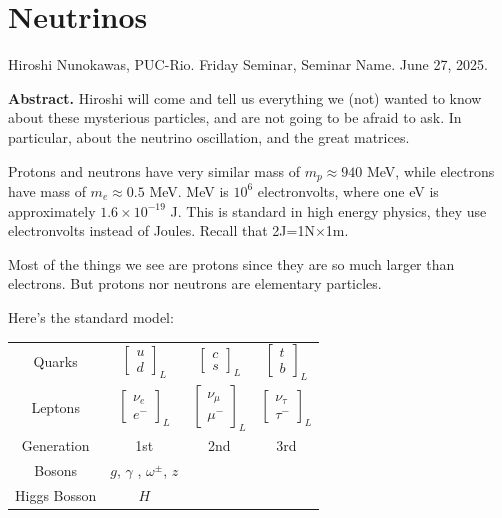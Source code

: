 \section{Neutrinos}
\label{section-neutrinos}

\noindent
Hiroshi Nunokawas, PUC-Rio.
Friday Seminar, Seminar Name.
June 27, 2025.

\medskip\noindent
{\bf Abstract.} Hiroshi will come and tell us
everything we (not) wanted to know
about these mysterious particles, and are not
going to be afraid to ask. In
particular, about the neutrino oscillation,
and the great matrices.

\bigskip\noindent

Protons and neutrons have very similar mass
of $m_p\approx 940$ MeV, while
electrons have mass of $m_e \approx 0.5$ MeV.
MeV is $10^{6}$ electronvolts,
where one eV is approximately $1.6\times
10^{-19}$ J. This is standard in high
energy physics, they use electronvolts
instead of Joules. Recall that
2J=1N$\times$1m.

Most of the things we see are protons since
they are so much larger than
electrons. But protons nor neutrons are
elementary particles.

Here's the standard model:

\medskip

\begin{tabular}{c c c c}
Quarks & $\begin{bmatrix} u\\d
\end{bmatrix}_L $ & $\begin{bmatrix} c\\s
\end{bmatrix}_L$ & $\begin{bmatrix} t\\b
\end{bmatrix}_L$\\
Leptons & $\begin{bmatrix} \nu_e\\e^-
\end{bmatrix}_L $ & $\begin{bmatrix}
\nu_\mu\\ \mu^-
\end{bmatrix}_L$ & $\begin{bmatrix}
\nu_\tau\\ \tau^- \end{bmatrix}_L$\\
Generation & 1st & 2nd & 3rd\\
Bosons & $g$, $\gamma$ , $\omega^\pm$, $z$ \\
Higgs Bosson & $H$
\end{tabular}


